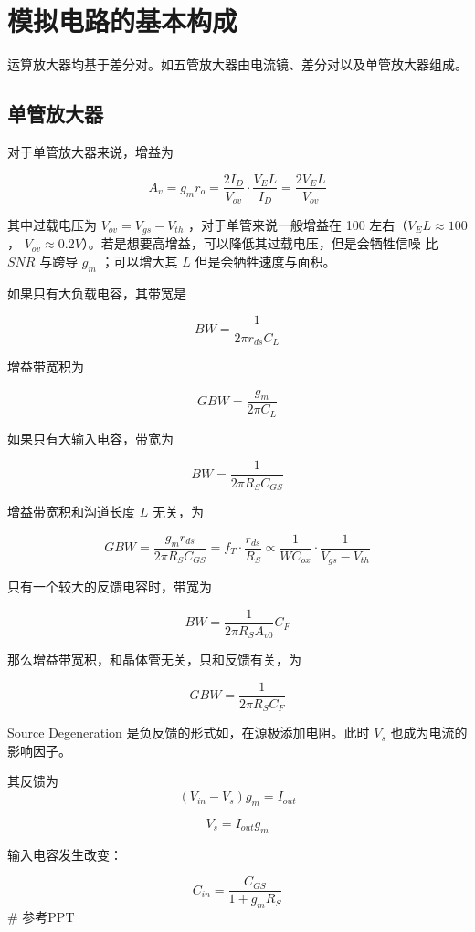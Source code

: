 \documentclass[cn,11pt,chinese,black,simple]{../elegantbook}
\begin{document}
\fi 
\def\chapname{02iccomp}

\chapter{模拟电路的基本构成}

运算放大器均基于差分对。如五管放大器由电流镜、差分对以及单管放大器组成。


\section{单管放大器}

对于单管放大器来说，增益为 


\[A_v = g_m r_o = \frac{2 I_D}{V_{ov}} \cdot \frac{V_E L}{I_D} = \frac{2 V_E L }{V_{ov}}\]

其中过载电压为 \(V_{ov} = V_{gs} - V_{th}\) ，对于单管来说一般增益在 100 左右（\(V_{E} L \approx 100\) ， \(V_{ov} \approx 0.2 V\)）。若是想要高增益，可以降低其过载电压，但是会牺牲信噪 比 \(SNR\) 与跨导 \(g_m\) ；可以增大其 \(L\) 但是会牺牲速度与面积。

如果只有大负载电容，其带宽是 

\[BW = \frac{1}{2 \pi r_{ds} C_L}\]

增益带宽积为 

\[GBW = \frac{g_m}{2 \pi C_L}\]

如果只有大输入电容，带宽为

\[BW = \frac{1}{2 \pi R_S C_{GS}}\]

增益带宽积和沟道长度 \(L\) 无关，为

\[GBW = \frac{g_m r_{ds}}{2 \pi R_S C_{GS}} = f_T \cdot \frac{r_{ds}}{R_S} \propto \frac{1}{W C_{{ox}}} \cdot \frac{1}{V_{gs} - V_{th}}\]

只有一个较大的反馈电容时，带宽为

\[BW = \frac{1}{2 \pi R_S A_{v0}} C_F\]

那么增益带宽积，和晶体管无关，只和反馈有关，为

\[GBW = \frac{1}{2 \pi R_S C_F}\]

Source Degeneration 是负反馈的形式如\figref{\chapname 1}，在源极添加电阻。此时 \(V_s\) 也成为电流的影响因子。


其反馈为 \[(V_{in} - V_s) g_m = I_{out}\] 

\[V_s = I_{out} g_m\]

输入电容发生改变：

\[C_{in} = \frac{C_{GS}}{1 + g_m R_S}\] #  参考PPT
\end{document}
